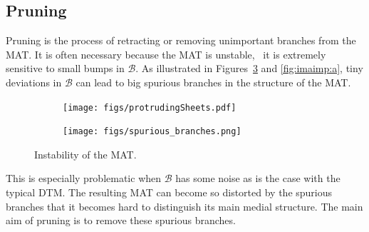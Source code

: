 
\subsection{Pruning}
Pruning is the process of retracting or removing unimportant branches from the MAT.
It is often necessary because the MAT is unstable, \ie\ it is extremely sensitive to small bumps in $\mathcal{B}$.
As illustrated in Figures~\ref{fig:mat-instability} and \ref{fig:imaimp:a}, tiny deviations in $\mathcal{B}$ can lead to big spurious branches in the structure of the MAT.
\begin{figure}
	\centering
	\begin{subfigure}{0.425\linewidth}
		\centering
		\texttt{[image: figs/protrudingSheets.pdf]}
		\label{fig:mat-bumps}
	\end{subfigure}
	\qquad
	\begin{subfigure}{0.50\linewidth}
		\centering
		\texttt{[image: figs/spurious\_branches.png]}
		\label{fig:sb_noise}
	\end{subfigure}
	\caption{Instability of the MAT.}
	\label{fig:mat-instability}
\end{figure}
This is especially problematic when $\mathcal{B}$ has some noise as is the case with the typical DTM.
The resulting MAT can become so distorted by the spurious branches that it becomes hard to distinguish its main medial structure.
The main aim of pruning is to remove these spurious branches.

